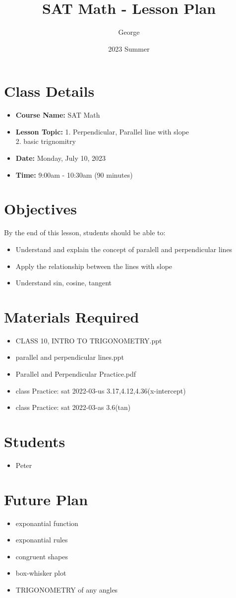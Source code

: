 \documentclass[12pt]{article}
\title{SAT Math - Lesson Plan}
\author{George}
\date{2023 Summer}
\begin{document}
\maketitle

\section{Class Details}
\begin{itemize}
    \item \textbf{Course Name:} SAT Math
    \item \textbf{Lesson Topic:} 1. Perpendicular, Parallel line with slope\\
     2.  basic trignomitry
    \item \textbf{Date:} Monday, July 10, 2023
    \item \textbf{Time:} 9:00am - 10:30am (90 minutes)
\end{itemize}

\section{Objectives}
By the end of this lesson, students should be able to:
\begin{itemize}
    \item Understand and explain the concept of paralell and perpendicular lines
    \item Apply the relationship between the lines with slope
    \item Understand sin, cosine, tangent
\end{itemize}

\section{Materials Required}
\begin{itemize}
   
    \item CLASS 10, INTRO TO TRIGONOMETRY.ppt
    \item parallel and perpendicular lines.ppt
    \item Parallel and Perpendicular Practice.pdf
    \item class Practice: sat 2022-03-us 3.17,4.12,4.36(x-intercept)
    \item class Practice: sat 2022-03-as 3.6(tan)
  
\end{itemize}


\section{Students}
\begin{itemize}
    \item Peter

\end{itemize}
\section{Future Plan}
\begin{itemize}
    \item exponantial function
    \item exponantial rules
    \item congruent shapes
    \item box-whisker plot
    \item TRIGONOMETRY of any angles

\end{itemize}
\end{document}

